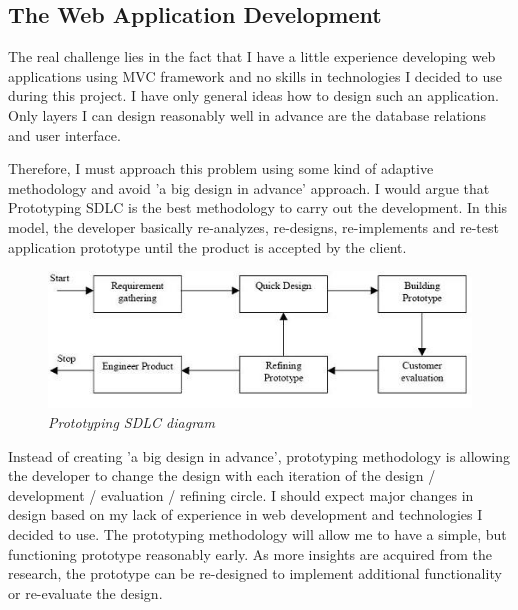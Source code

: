 \documentclass[12pt,twoside,a4paper]{report}
\begin{document}
\subsection{The Web Application Development}\label{1.6.2}
The real challenge lies in the fact that I have a little experience developing web applications using MVC framework and no skills in technologies I decided to use during this project. I have only general ideas how to design such an application. Only layers I can design reasonably well in advance are the database relations and user interface.\par
Therefore, I must approach this problem using some kind of adaptive methodology and avoid 'a big design in advance' approach. I would argue that Prototyping SDLC is the best methodology to carry out the development. In this model, the developer basically re-analyzes, re-designs, re-implements and re-test application prototype until the product is accepted by the client.
\begin{figure}[!ht]
	\centering
		\includegraphics[width=1\textwidth, totalheight=6cm]{prototyping}
	\caption{\textit{Prototyping SDLC diagram}}
	\label{f1.1}
\end{figure}
Instead of creating 'a big design in advance', prototyping methodology is allowing the developer to change the design with each iteration of the design / development / evaluation / refining circle. I should expect major changes in design based on my lack of experience in web development and technologies I decided to use. The prototyping methodology will allow me to have a simple, but functioning prototype reasonably early. As more insights are acquired from the research, the prototype can be re-designed to implement additional functionality or re-evaluate the design.
\end{document}

